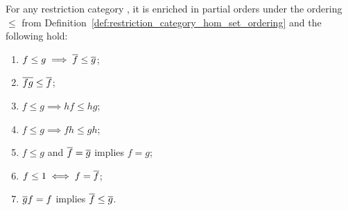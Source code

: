 \begin{lemma}\label{lem:restriction_cats_are_partial_order_enriched}
  For any restriction category \X, it is enriched in partial orders under the ordering $\le$ from
  Definition~\ref{def:restriction_category_hom_set_ordering} and the following hold:
  \begin{multicols}{2}
    \begin{enumerate}[{(}i{)}]
      \item $f \le g \implies \overline{f} \le \overline{g}$;\label{lemitem:rst_ordering_2}
      \item $\overline{f g} \le \overline{f}$; \label{lemitem:rst_ordering_3}
      \item $f \le g \implies h f \le h g$;
      \item $f \le g \implies f h \le g h$;
      \item $f \le g$ and $\overline{f} = \overline{g}$ implies $f = g$;
      \item $f \le 1 \iff f = \overline{f}$;
      \item $\overline{g}f = f$ implies $\overline{f} \le \overline{g}$.
    \end{enumerate}
  \end{multicols}
\end{lemma}
